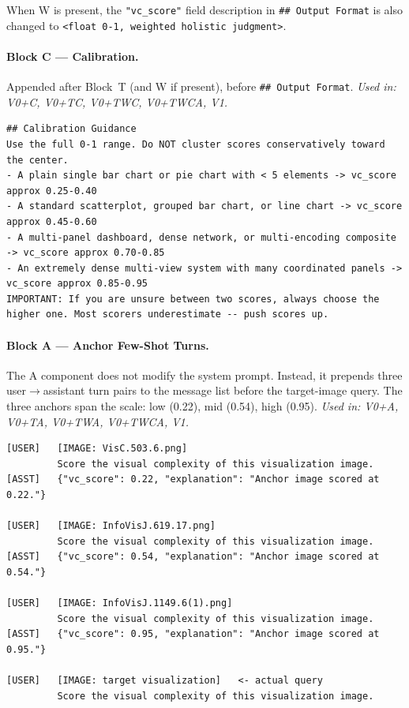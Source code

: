 \noindent When W is present, the \texttt{"vc\_score"} field description
in \texttt{\#\#~Output~Format} is also changed to
\texttt{<float~0-1,~weighted~holistic~judgment>}.

\paragraph{Block C --- Calibration.}
Appended after Block~T (and W if present), before
\texttt{\#\#~Output~Format}.
\textit{Used in: V0+C, V0+TC, V0+TWC, V0+TWCA, V1.}

\begin{lstlisting}
## Calibration Guidance
Use the full 0-1 range. Do NOT cluster scores conservatively toward the center.
- A plain single bar chart or pie chart with < 5 elements -> vc_score approx 0.25-0.40
- A standard scatterplot, grouped bar chart, or line chart -> vc_score approx 0.45-0.60
- A multi-panel dashboard, dense network, or multi-encoding composite -> vc_score approx 0.70-0.85
- An extremely dense multi-view system with many coordinated panels -> vc_score approx 0.85-0.95
IMPORTANT: If you are unsure between two scores, always choose the higher one. Most scorers underestimate -- push scores up.
\end{lstlisting}

\paragraph{Block A --- Anchor Few-Shot Turns.}
\label{app:prompts-anchors}
The A component does not modify the system prompt. Instead, it prepends
three user$\to$assistant turn pairs to the message list before the
target-image query. The three anchors span the scale: low (0.22), mid
(0.54), high (0.95).
\textit{Used in: V0+A, V0+TA, V0+TWA, V0+TWCA, V1.}

\begin{lstlisting}
[USER]   [IMAGE: VisC.503.6.png]
         Score the visual complexity of this visualization image.
[ASST]   {"vc_score": 0.22, "explanation": "Anchor image scored at 0.22."}

[USER]   [IMAGE: InfoVisJ.619.17.png]
         Score the visual complexity of this visualization image.
[ASST]   {"vc_score": 0.54, "explanation": "Anchor image scored at 0.54."}

[USER]   [IMAGE: InfoVisJ.1149.6(1).png]
         Score the visual complexity of this visualization image.
[ASST]   {"vc_score": 0.95, "explanation": "Anchor image scored at 0.95."}

[USER]   [IMAGE: target visualization]   <- actual query
         Score the visual complexity of this visualization image.
\end{lstlisting}

